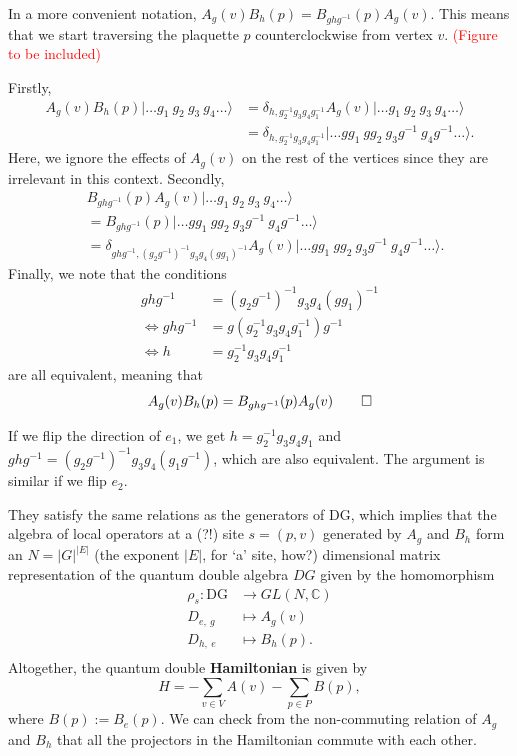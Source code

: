 \documentclass[11pt, a4paper]{article}
\begin{document}
In a more convenient notation, $A_g(v)B_h(p) = B_{ghg^{-1}}(p)A_g(v)$. This means that we start traversing the plaquette $p$ counterclockwise from vertex $v$. \textcolor{red}{(Figure to be included)}

Firstly,
\begin{align*}
    A_g(v)B_h(p)|\dots g_1~g_2~g_3~g_4\dots\rangle
    &= \delta_{h,g_2^{-1}g_3g_4g_1^{-1}}A_g(v)|\dots g_1~g_2~g_3~g_4\dots\rangle\\
    &= \delta_{h,g_2^{-1}g_3g_4g_1^{-1}}|\dots gg_1~gg_2~g_3g^{-1}~g_4g^{-1}\dots\rangle.
\end{align*}
Here, we ignore the effects of $A_g(v)$ on the rest of the vertices since they are irrelevant in this context. Secondly,
\begin{align*}
    & B_{ghg^{-1}}(p)A_g(v)|\dots g_1~g_2~g_3~g_4\dots\rangle\\
    &= B_{ghg^{-1}}(p)|\dots gg_1~gg_2~g_3g^{-1}~g_4g^{-1}\dots\rangle\\
    &= \delta_{ghg^{-1},\left(g_2g^{-1}\right)^{-1}g_3g_4\left(gg_1\right)^{-1}}A_g(v)|\dots gg_1~gg_2~g_3g^{-1}~g_4g^{-1}\dots\rangle.
\end{align*}
Finally, we note that the conditions
\begin{align*}
    ghg^{-1} &= \left(g_2g^{-1}\right)^{-1}g_3g_4\left(gg_1\right)^{-1}\\
    \Leftrightarrow ghg^{-1} &= g\left(g_2^{-1}g_3g_4g_1^{-1}\right)g^{-1}\\
    \Leftrightarrow h &= g_2^{-1}g_3g_4g_1^{-1}
\end{align*}
are all equivalent, meaning that
\begin{equation*}
    A_g(v)B_h(p) = B_{ghg^{-1}}(p)A_g(v) \qed
\end{equation*}

{\footnotesize If we flip the direction of $e_1$, we get $h = g_2^{-1}g_3g_4g_1$ and $ghg^{-1} = \left(g_2g^{-1}\right)^{-1}g_3g_4\left(g_1g^{-1}\right)$, which are also equivalent. The argument is similar if we flip $e_2$.}

They satisfy the same relations as the generators of $\mathrm{DG}$, which implies that the algebra of local operators at a (?!) site $s = (p, v)$ generated by $A_g$ and $B_h$ form an $N = |G|^{|E|}$ (the exponent $|E|$, for `a' site, how?) dimensional matrix representation of the quantum double algebra $DG$ given by the homomorphism
\begin{align*}
    \rho_s: \mathrm{DG} &\to GL(N, \mathbb{C})\\
    D_{e,~g} &\mapsto A_g(v)\\
    D_{h,~e} &\mapsto B_h(p).\\
\end{align*}
Altogether, the quantum double \textbf{Hamiltonian} is given by
\begin{equation}
    H = -\sum_{v \in V} A(v) - \sum_{p \in P}B(p),
\end{equation}
where $B(p) := B_e(p)$. We can check from the non-commuting relation of $A_g$ and $B_h$ that all the projectors in the Hamiltonian commute with each other.
\end{document}
